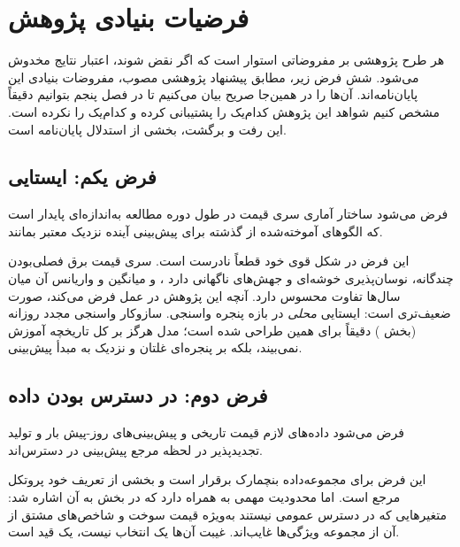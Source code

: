 
\section{فرضیات بنیادی پژوهش}

هر طرح پژوهشی بر مفروضاتی استوار است که اگر نقض شوند، اعتبار نتایج مخدوش
می‌شود. شش فرض زیر، مطابق پیشنهاد پژوهشی مصوب، مفروضات بنیادی این
پایان‌نامه‌اند. آن‌ها را در همین‌جا صریح بیان می‌کنیم تا در فصل پنجم
بتوانیم دقیقاً مشخص کنیم شواهد این پژوهش کدام‌یک را پشتیبانی کرده و
کدام‌یک را نکرده است. این رفت و برگشت، بخشی از استدلال پایان‌نامه است.

\subsection*{فرض یکم: ایستایی}

فرض می‌شود ساختار آماری سری قیمت در طول دوره مطالعه به‌اندازه‌ای پایدار
است که الگوهای آموخته‌شده از گذشته برای پیش‌بینی آینده نزدیک معتبر
بمانند.

این فرض در شکل قوی خود قطعاً نادرست است. سری قیمت برق فصلی‌بودن چندگانه،
نوسان‌پذیری خوشه‌ای و جهش‌های ناگهانی دارد
\cite{jiang_review_2018, ugurlu_electricity_2018}، و میانگین و واریانس آن
میان سال‌ها تفاوت محسوس دارد. آنچه این پژوهش در عمل فرض می‌کند، صورت
ضعیف‌تری است: ایستایی \emph{محلی} در بازه پنجره واسنجی. سازوکار واسنجی
مجدد روزانه (بخش ) دقیقاً برای همین طراحی شده است؛ مدل هرگز بر
کل تاریخچه آموزش نمی‌بیند، بلکه بر پنجره‌ای غلتان و نزدیک به مبدأ
پیش‌بینی.

\subsection*{فرض دوم: در دسترس بودن داده}

فرض می‌شود داده‌های لازم  قیمت تاریخی و پیش‌بینی‌های روز-پیش بار و
تولید تجدیدپذیر  در لحظه مرجع پیش‌بینی در دسترس‌اند.

این فرض برای مجموعه‌داده بنچمارک برقرار است و بخشی از تعریف خود پروتکل
مرجع است. اما محدودیت مهمی به همراه دارد که در بخش  به آن اشاره
شد: متغیرهایی که در دسترس عمومی نیستند  به‌ویژه قیمت سوخت و
شاخص‌های مشتق از آن  از مجموعه ویژگی‌ها غایب‌اند. غیبت آن‌ها یک
انتخاب نیست، یک قید است.

